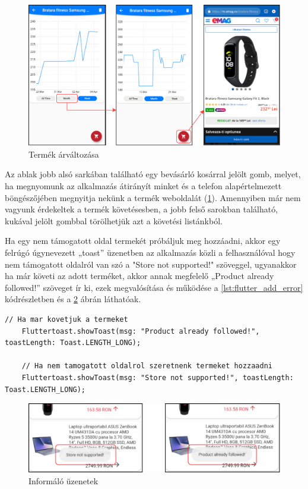 \begin{figure}[H]
    \centering
    \includegraphics[scale=1]{figures/images/flutter_chart.png}
    \caption{Termék árváltozása}
    \label{fig:flutter_chart}
\end{figure}

Az ablak jobb alsó sarkában található egy bevásárló kosárral jelölt gomb, melyet, ha megnyomunk az alkalmazás átirányít minket és a telefon alapértelmezett böngészőjében megnyitja nekünk a termék weboldalát (\ref{fig:flutter_chart}). Amennyiben már nem vagyunk érdekeltek a termék követésesben, a jobb felső sarokban található, kukával jelölt gombbal törölhetjük azt a követési listánkból.

Ha egy nem támogatott oldal termekét próbáljuk meg hozzáadni, akkor egy felrúgó úgynevezett „toast” üzenetben az alkalmazás közli a felhasználóval hogy nem támogatott oldalról van szó a "Store not supported!" szöveggel, ugyanakkor ha már követi az adott terméket, akkor annak megfelelő „Product already followed!” szöveget ír ki, ezek megvalósítása és működése a \ref{lst:flutter_add_error} kódrészletben és a  \ref{fig:flutter_add_error} ábrán láthatóak.

\begin{lstlisting}[caption={Informáló üzeneteket megjelenítő függvények}, label={lst:flutter_add_error}, basicstyle=\footnotesize]
    // Ha mar kovetjuk a termeket
    Fluttertoast.showToast(msg: "Product already followed!", toastLength: Toast.LENGTH_LONG);

    // Ha nem tamogatott oldalrol szeretnenk termeket hozzaadni
    Fluttertoast.showToast(msg: "Store not supported!", toastLength: Toast.LENGTH_LONG);
\end{lstlisting}

\begin{figure}[H]
    \centering
    \includegraphics[scale=1]{figures/images/flutter_add_error.png}
    \caption{Informáló üzenetek}
    \label{fig:flutter_add_error}
\end{figure}
